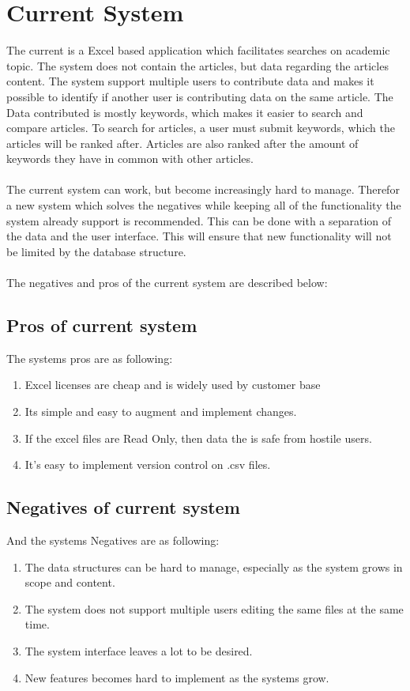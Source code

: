 \section{Current System}

The current is a Excel based application which facilitates searches on academic topic. The system does not contain the articles, but data regarding the articles content. 
The system support multiple users to contribute data and makes it possible to identify if another user is contributing data on the same article. The Data contributed is mostly keywords, which makes it easier to search and compare articles. 
To search for articles, a user must submit keywords, which the articles will be ranked after. Articles are also ranked after the amount of keywords they have in common with other articles. 
\\\\
The current system can work, but become increasingly hard to manage. Therefor a new system which solves the negatives while keeping all of the functionality the system already support is recommended. This can be done with a separation of the data and the user interface. This will ensure that new functionality will not be limited by the database structure. 
\\\\
The negatives and pros of the current system are described below:

\subsection{Pros of current system}
The systems pros are as following:

\begin{enumerate}
	\item Excel licenses are cheap and is widely used by customer base
	\item Its simple and easy to augment and implement changes.
	\item If the excel files are Read Only, then data the is safe from hostile users.
	\item It's easy to implement version control on .csv files. 
\end{enumerate}

\subsection{Negatives of current system} 
And the systems Negatives are as following: 

\begin{enumerate}
	\item The data structures can be hard to manage, especially as the system grows in scope and content.
	\item The system does not support multiple users editing the same files at the same time.
	\item The system interface leaves a lot to be desired.
	\item New features becomes hard to implement as the systems grow.
\end{enumerate}
